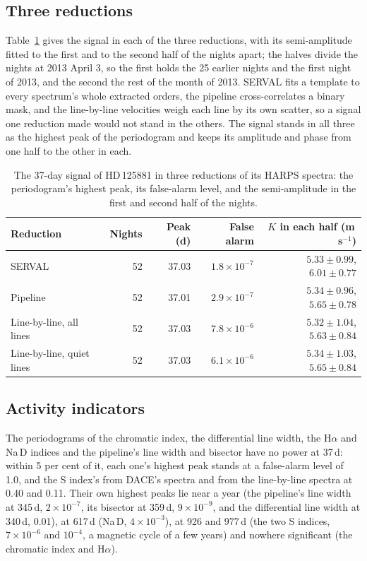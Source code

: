 \documentclass[3p,11pt]{elsarticle}
\newcommand{\ms}{m\,s$^{-1}$}
\begin{document}
\subsection{Three reductions}

Table~\ref{tab:reductions} gives the signal in each of the three reductions, with its semi-amplitude
fitted to the first and to the second half of the nights apart; the halves divide the nights at 2013
April 3, so the first holds the 25 earlier nights and the first night of 2013, and the second the rest
of the month of 2013. SERVAL fits a template to every spectrum's whole extracted orders, the pipeline
cross-correlates a binary mask, and the line-by-line velocities weigh each line by its own scatter, so
a signal one reduction made would not stand in the others. The signal stands in all three as the
highest peak of the periodogram and keeps its amplitude and phase from one half to the other in each.

\begin{table}[!htbp]
\centering
\caption{The 37-day signal of HD\,125881 in three reductions of its HARPS spectra: the periodogram's
highest peak, its false-alarm level, and the semi-amplitude in the first and second half of the
nights.}\label{tab:reductions}
\begin{tabular}{l r r r r}
\toprule
Reduction & Nights & Peak (d) & False alarm & $K$ in each half (\ms) \\
\midrule
SERVAL & 52 & 37.03 & $1.8\times10^{-7}$ & $5.33 \pm 0.99$, $6.01 \pm 0.77$ \\
Pipeline & 52 & 37.01 & $2.9\times10^{-7}$ & $5.34 \pm 0.96$, $5.65 \pm 0.78$ \\
Line-by-line, all lines & 52 & 37.03 & $7.8\times10^{-6}$ & $5.32 \pm 1.04$, $5.63 \pm 0.84$ \\
Line-by-line, quiet lines & 52 & 37.03 & $6.1\times10^{-6}$ & $5.34 \pm 1.03$, $5.65 \pm 0.84$ \\
\bottomrule
\end{tabular}
\end{table}

\subsection{Activity indicators}

The periodograms of the chromatic index, the differential line width, the H$\alpha$ and Na\,D indices
and the pipeline's line width and bisector have no power at 37\,d: within 5 per cent of it, each one's
highest peak stands at a false-alarm level of 1.0, and the S index's from DACE's spectra and from the
line-by-line spectra at 0.40 and 0.11. Their own highest peaks lie near a year (the pipeline's line
width at 345\,d, $2\times10^{-7}$, its bisector at 359\,d, $9\times10^{-9}$, and the differential line
width at 340\,d, 0.01), at 617\,d (Na\,D, $4\times10^{-3}$), at 926 and 977\,d (the two S indices,
$7\times10^{-6}$ and $10^{-4}$, a magnetic cycle of a few years) and nowhere significant (the chromatic
index and H$\alpha$).
\end{document}
